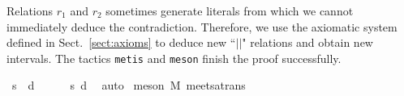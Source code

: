 \documentclass{llncs}
\begin{document}

Relations $r_1$ and $r_2$ sometimes generate literals from which we cannot immediately deduce the contradiction. Therefore, we use the axiomatic system defined in Sect.~\ref{sect:axioms} to deduce new ``$||$" relations and obtain new intervals. The tactics \texttt{metis} and \texttt{meson}  finish the proof successfully. %
\begin{isabellebody}
\isanewline
{}\isamarkupfalse%
 \ {\isachardoublequoteopen}s\ {\isasyminter}\ d\ {\isacharequal}\ {\isacharbraceleft}{\isacharbraceright}{\isachardoublequoteclose}\ \isanewline
%
%
{}\isamarkupfalse%
\ \isamarkupfalse%
\ s\ d\ \isamarkupfalse%
\ auto\isanewline
{}\isamarkupfalse%
\ {\isacharparenleft}meson\ M{}\ meets{\isacharunderscore}atrans{\isacharparenright}%
{\isafoldproof}%
%
\isanewline
\end{isabellebody}
\end{document}
